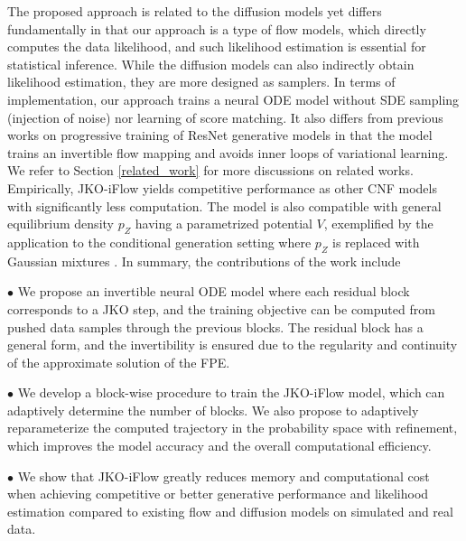 \documentclass{article}
\theoremstyle{remark}
\theoremstyle{plain}
\newcommand{\JKO}{JKO-iFlow}
\newcommand{\revold}[1]{{\color{black}#1}}
\begin{document}
% 
The proposed approach is related to the diffusion models \citep{song2019generative,ho2020denoising,block2020generative,song2021score} yet differs fundamentally in that our approach is a type of flow models, which directly computes the data likelihood, and such likelihood estimation is essential for statistical inference. While the diffusion models can also indirectly obtain likelihood estimation, they are more designed as samplers.
\revold{In terms of implementation, our approach} trains a neural ODE model without SDE sampling (injection of noise) nor learning of score matching.
It also differs from previous works on progressive training of ResNet generative models \cite{johnson2019framework,fan2022variational} in that the model trains an invertible flow mapping and avoids inner loops of variational learning. We refer to Section \ref{related_work} for more discussions on related works. 
%
Empirically, \JKO{} yields competitive performance as other CNF models with significantly less computation. 
The model is also compatible with general equilibrium density $p_Z$ having a parametrized potential $V$, exemplified by the application to the conditional generation setting where $p_Z$ is replaced with Gaussian mixtures \cite{xu2022invertible}.
%
In summary, the contributions of the work include

\vspace{5pt}
$\bullet$ We propose \revold{an invertible} neural ODE model where each residual block \revold{corresponds to} a JKO step, and the training objective can be computed \revold{from pushed data samples through the previous blocks.}
The residual block has a general form, and the invertibility is ensured due to the regularity and continuity of the approximate solution of the FPE.

\vspace{5pt}
$\bullet$ We develop a block-wise procedure to train the \JKO{} model, which can adaptively determine the number of blocks.
%
We also propose to adaptively reparameterize the computed trajectory in the probability space with refinement, which \revold{improves the model accuracy and the overall computational efficiency.} 

\vspace{5pt}
$\bullet$
We show that \JKO{} greatly reduces memory and computational cost when achieving competitive or better generative performance 
and likelihood estimation 
compared to existing flow and diffusion models on simulated and real data.
\end{document}
